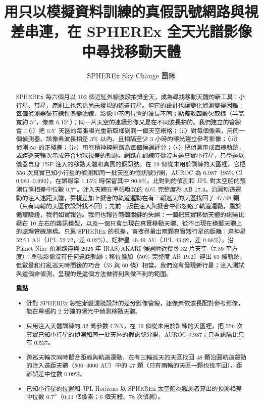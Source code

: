 \documentclass[twocolumn]{aastex631}
\begin{document}
\title{用只以模擬資料訓練的真假訊號網路與視差串連，在 SPHEREx 全天光譜影像中尋找移動天體}
\author{SPHEREx Sky Change 團隊}
\begin{abstract}
SPHEREx 每六個月以 102 個近紅外線波段拍攝全天，成為尋找移動天體的新工具：小行星、彗星，原則上也包括尚未發現的遙遠行星。但它的設計也讓變化偵測變得困難：每個偵測器裝有線性漸變濾鏡，影像中不同位置的波長不同；點擴散函數欠取樣（半高寬約 5$''$，像素 6.15$''$）；同一片天空的連續影像又是在不同波長拍的。我們建立的管線會：（i）把 0.5$^\circ$ 天區的每張曝光重新取樣到同一個天空網格；（ii）對每個像素，用同一個偵測器、該像素波長相差 3\% 以內、且相隔至少 3 小時的曝光建立參考影像；（iii）偵測 5$\sigma$ 的正殘差；（iv）用卷積神經網路為每個候選評分；（v）把偵測串成直線軌跡，或跨巡天輪次串成符合地球視差的軌跡。網路在訓練時從沒看過真實小行星，只學過以儀器自身 PSF 注入的移動天體和真實的假訊號。在 19 個從未用於訓練的天區裡，它把 556 次真實已知小行星的偵測和同一批天區的假訊號分開，AUROC 為 0.987（95\% CI 0.981--0.992），在誤報率 1.15\% 時保留其中 90.8\%。比對到的偵測和 JPL 對太空船的預測位置相差中位數 0.7$''$。注入天體在單張曝光的 50\% 完整度為 AB 17.3。沿圓軌道運動的注入遠距天體，靠視差加上擬合的軌道運動在有三輪巡天的天區找回了 47/48 顆（只有兩輪的天區依設計找不回）；先前一版在注入與擬合中都忽略了軌道運動，屬於循環驗證，我們如實報告。我們也報告兩個關鍵的失誤：一個把真實移動天體的訊噪比壓在 10 左右的雜訊模型，以及一個只會出現在真實移動天體、從不出現在模擬天體上的處理管線旗標。只靠 SPHEREx 的視差，盲搜尋量出兩顆真實矮行星的距離：鳥神星 52.71 AU（JPL 52.72，差 0.02\%）、妊神星 49.49 AU（JPL 49.82，差 0.66\%）。沿 Planet Nine 預測路徑與 2025 年 IRAS/AKARI 候選附近搜尋 32 片天空（7.89 平方度）：單張影像沒有任何遠距軌跡；移位疊加（50\% 完整度 AB 19.2）連出 63 條軌跡，但數量和打亂巡天時間後的巧合（55 與 60 條）相當。我們沒有發現新行星；注入測試與這個非偵測，呈現的是這個方法做得到與做不到的範圍。

\medskip\noindent\textbf{重點}
\begin{itemize}\setlength{\itemsep}{1pt}
\item 針對 SPHEREx 線性漸變濾鏡設計的差分影像管線，逐像素依波長配對參考影像，能在單張約 2 分鐘的曝光中偵測移動天體。
\item 只用注入天體訓練的 32 萬參數 CNN，在 19 個從未用於訓練的天區裡，把 556 次真實已知小行星的偵測和同一批天區的假訊號分開，AUROC 0.987；只看訊噪比只有 0.537。
\item 跨巡天輪次同時擬合距離與軌道運動，在有三輪巡天的天區找回 48 顆沿圓軌道運動的注入遠距天體（500--3000 AU）中的 47 顆（只有兩輪的天區一顆也找不回），距離誤差中位數 0.09\%。
\item 已知小行星的位置和 JPL Horizons 以 SPHEREx 太空船為觀測者算出的預測相差中位數 0.7$''$（0.11 個像素；6 個天體、78 次偵測）。
\end{itemize}
\end{abstract}
\end{document}
